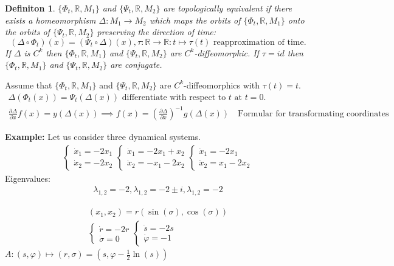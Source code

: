 \documentclass{article}
\newtheorem*{definition}{Definiton}
\theoremstyle{named}
\begin{document}
\begin{definition}
	$\{ \Phi_t, \mathbb R, M_1 \}$ and $\{ \Psi_t, \mathbb R, M_2 \}$ are topologically equivalent if there exists a homeomorphism  $\Delta: M_1 \to M_2$ which maps the orbits of $\{ \Phi_t, \mathbb R, M_1 \}$ onto the orbits of $\{ \Psi_t, \mathbb R, M_2 \}$ preserving the direction of time:
	\[
		(\Delta \circ \Phi_t)(x) = (\Psi_t \circ \Delta)(x), \tau: \mathbb R \to \mathbb R: t \mapsto \tau(t) \text{ reapproximation of time}.
	\]
	If $\Delta$ is $C^k$ then $\{ \Phi_t, \mathbb R, M_1 \}$ and $\{ \Psi_t, \mathbb R, M_2 \}$ are $C^k$-diffeomorphic. If $\tau = id$ then $\{ \Phi_t, \mathbb R, M_1 \}$ and $\{ \Psi_t, \mathbb R, M_2 \}$ are conjugate.
\end{definition}

Assume that $\{ \Phi_t, \mathbb R, M_1 \}$ and $\{ \Psi_t, \mathbb R, M_2 \}$ are $C^k$-diffeomorphics with $\tau(t) = t$.
\begin{gather*}
	\Delta(\Phi_t(x)) = \Psi_t(\Delta(x))  \text{ differentiate with respect to } t \text{ at } t= 0. \\
	\frac{\partial \Delta}{\partial x}f(x) = y(\Delta(x)) \implies f(x) = (\frac{\partial \Delta}{\partial x})^{-1}g(\Delta(x)) \quad \text{Formular for transformating coordinates}
\end{gather*}

\textbf{Example:} Let us consider three dynamical systems.
\begin{align*}
\begin{cases}
\dot x_1 = -2x_1 \\
\dot x_2 = -2x_2
\end{cases} 
\begin{cases}
\dot x_1 = -2x_1 +x_2\\
\dot x_2 = -x_1-2x_2
\end{cases}
\begin{cases}
\dot x_1 = -2x_1 \\
\dot x_2 = x_1-2x_2
\end{cases}
\end{align*}
Eigenvalues:
\begin{align*}
\lambda_{1,2} = -2, \lambda_{1,2} = -2 \pm i, \lambda_{1,2} = -2
 \end{align*}

\begin{align*}
(x_1,x_2) = r (\sin(\sigma), \cos(\sigma)) \\
\begin{cases}
\dot r = -2r \\\dot \sigma = 0
\end{cases}
\begin{cases}
\dot s = -2s \\
\dot \varphi = -1
\end{cases}
\end{align*}
$A: (s, \varphi) \mapsto (r, \sigma) = (s, \varphi - \frac{1}{2}\ln(s))$
\end{document}
